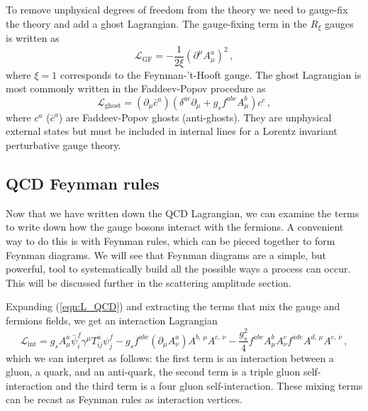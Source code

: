 \documentclass[main.tex]{subfiles}
\begin{document}
    To remove unphysical degrees of freedom from the
    theory we need to gauge-fix the theory
    and add a ghost Lagrangian. The gauge-fixing term
    in the $R_{\xi}$ gauges is written as
    \begin{equation}\label{eqn:L_GF}
        \mathcal{L}_{\mathrm{GF}} = -\dfrac{1}{2\xi}(\partial^{\mu}A_{\mu}^{a})^{2} \, ,
    \end{equation}
    where $\xi = 1$ corresponds to the Feynman-'t-Hooft gauge.
    The ghost Lagrangian is most commonly written
    in the Faddeev-Popov procedure as
    \begin{equation}\label{eqn:L_ghost}
        \mathcal{L}_{\mathrm{ghost}} = (\partial_{\mu}\bar{c}^{a})(\delta^{ac}\partial_{\mu} + g_{s}f^{abc}A^{b}_{\mu})c^{c} \, ,
    \end{equation}
    where $c^{a}$ ($\bar{c}^{a}$) are Faddeev-Popov ghosts (anti-ghosts).
    They are unphysical external states but must be
    included in internal lines for a Lorentz invariant
    perturbative gauge theory.

    \subsection{QCD Feynman rules}\label{sec:qcd_feynman}
    Now that we have written down the QCD Lagrangian,
    we can examine the terms to write down how the
    gauge bosons interact with the fermions. A convenient
    way to do this is with Feynman rules, which can be
    pieced together to form Feynman diagrams. We will see
    that Feynman diagrams are a simple, but powerful, tool
    to systematically build all the possible ways a process
    can occur. This will be discussed further in the
    scattering amplitude section.

    Expanding (\ref{eqn:L_QCD}) and extracting the terms
    that mix the gauge and fermions fields, we get an interaction Lagrangian
    \begin{equation}\label{L_int}
        \mathcal{L}_{\mathrm{int}} = g_{s}A^{a}_{\mu}\bar{\psi}_{i}^{f}\gamma^{\mu}T^{a}_{ij}\psi_{j}^{f}-g_{s}f^{abc}(\partial_{\mu}A^{a}_{\nu})A^{b,\,\mu}A^{c,\,\nu} -\dfrac{g_{s}^{2}}{4}f^{abc}A^{b}_{\mu}A^{c}_{\nu}f^{ade}A^{d,\,\mu}A^{e,\,\nu} \, ,
    \end{equation}
    which we can interpret as follows: the first term
    is an interaction between a gluon, a quark, and an
    anti-quark, the second term is a triple gluon
    self-interaction and the third term is a four gluon
    self-interaction. These mixing terms can be recast
    as Feynman rules as interaction vertices.
\end{document}
